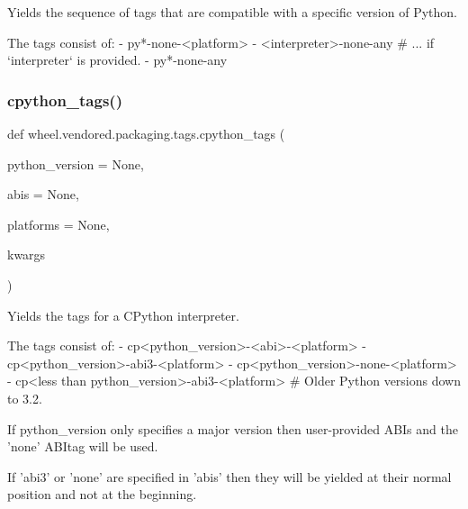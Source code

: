 \begin{DoxyVerb}Yields the sequence of tags that are compatible with a specific version of Python.

The tags consist of:
- py*-none-<platform>
- <interpreter>-none-any  # ... if `interpreter` is provided.
- py*-none-any
\end{DoxyVerb}
 \mbox{\label{namespacewheel_1_1vendored_1_1packaging_1_1tags_aae023c374ad7825b9d3f943d9e36b169}} 
\subsubsection{\texorpdfstring{cpython\+\_\+tags()}{cpython\_tags()}}
{\footnotesize\ttfamily def wheel.\+vendored.\+packaging.\+tags.\+cpython\+\_\+tags (\begin{DoxyParamCaption}\item[{}]{python\+\_\+version = {\ttfamily None},  }\item[{}]{abis = {\ttfamily None},  }\item[{}]{platforms = {\ttfamily None},  }\item[{}]{kwargs }\end{DoxyParamCaption})}

\begin{DoxyVerb}Yields the tags for a CPython interpreter.

The tags consist of:
- cp<python_version>-<abi>-<platform>
- cp<python_version>-abi3-<platform>
- cp<python_version>-none-<platform>
- cp<less than python_version>-abi3-<platform>  # Older Python versions down to 3.2.

If python_version only specifies a major version then user-provided ABIs and
the 'none' ABItag will be used.

If 'abi3' or 'none' are specified in 'abis' then they will be yielded at
their normal position and not at the beginning.
\end{DoxyVerb}
 \mbox{\label{namespacewheel_1_1vendored_1_1packaging_1_1tags_a199ba251a0877076b8007baffffed1a2}} 
